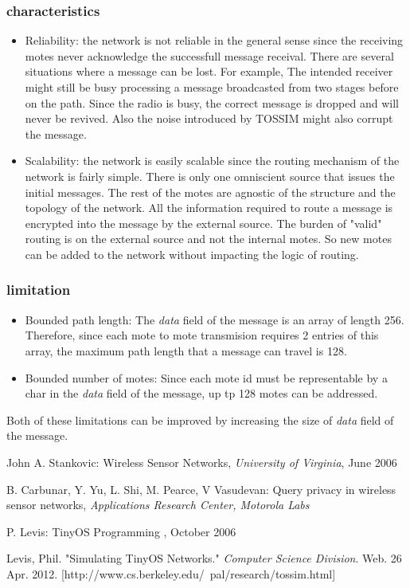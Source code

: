 \documentclass[11pt, titlepage, oneside]{article}
\begin{document}
\subsubsection{characteristics}
\begin{itemize}
\item Reliability: the network is not reliable in the general sense since the receiving motes never acknowledge the successfull message receival. There are several situations where a message can be lost. For example, The intended receiver might still be busy processing a message broadcasted from two stages before on the path. Since the radio is busy, the correct message is dropped and will never be revived. Also the noise introduced by TOSSIM might also corrupt the message.
\item Scalability: the network is easily scalable since the routing mechanism of the network is fairly simple. There is only one omniscient source that issues the initial messages. The rest of the motes are agnostic of the structure and the topology of the network. All the information required to route a message is encrypted into the message by the external source. The burden of "valid" routing is on the external source and not the internal motes. So new motes can be added to the network without impacting the logic of routing.
\end{itemize}
\subsubsection{limitation}

\begin{itemize}
\item Bounded path length: The {\it data} field of the message is an array of length 256. Therefore, since each mote to mote transmision requires 2 entries of this array, the maximum path length that a message can travel is 128. 
\item Bounded number of motes: Since each mote id must be representable by a char in the {\it data} field of the message, up tp 128 motes can be addressed.
\end{itemize}

Both of these limitations can be improved by increasing the size of {\it data} field of the message.
  
  
 
  
  
\newpage 
 
\begin{thebibliography}{9} 
John A. Stankovic: Wireless Sensor Networks, {\it University of Virginia}, June 2006


B. Carbunar, Y. Yu, L. Shi, M. Pearce, V Vasudevan: Query privacy in wireless sensor networks, {\it Applications Research Center, Motorola Labs}

P. Levis: TinyOS Programming , October 2006

Levis, Phil. "Simulating TinyOS Networks." {\it Computer Science Division}. Web. 26 Apr. 2012. [http://www.cs.berkeley.edu/~pal/research/tossim.html]
 
\end{thebibliography} 
  
\end{document}
